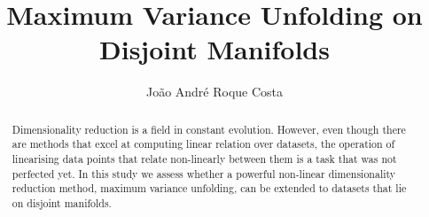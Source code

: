 \documentclass[a4paper]{article}
\begin{document}
\title{Maximum Variance Unfolding on Disjoint Manifolds} %
\author{João André Roque Costa}

\maketitle
\thispagestyle{empty}

\setlength{\abstitleskip}{-\absparindent}
\begin{abstract}
    Dimensionality reduction is a field in constant evolution. However, even though there are methods that excel at computing linear relation over datasets, the operation of linearising data points that relate non-linearly between them is a task that was not perfected yet.
    In this study we assess whether a powerful non-linear dimensionality reduction method, maximum variance unfolding, can be extended to datasets that lie on disjoint manifolds.
\clearpage
\end{abstract}

\tableofcontents
\thispagestyle{empty}
\clearpage









\clearpage
\normalem
\ULforem


\clearpage %
\appendix


\end{document}
